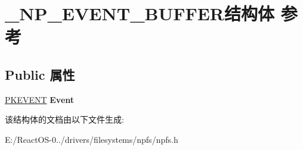 \hypertarget{struct___n_p___e_v_e_n_t___b_u_f_f_e_r}{}\section{\+\_\+\+N\+P\+\_\+\+E\+V\+E\+N\+T\+\_\+\+B\+U\+F\+F\+E\+R结构体 参考}
\label{struct___n_p___e_v_e_n_t___b_u_f_f_e_r}
\subsection*{Public 属性}
\begin{DoxyCompactItemize}
\item 
\mbox{\label{struct___n_p___e_v_e_n_t___b_u_f_f_e_r_ae2cadff7f9e0dba7adafa0858ba66b05}} 
\hyperlink{struct___k_e_v_e_n_t}{P\+K\+E\+V\+E\+NT} {\bfseries Event}
\end{DoxyCompactItemize}


该结构体的文档由以下文件生成\+:\begin{DoxyCompactItemize}
\item 
E\+:/\+React\+O\+S-\/0../drivers/filesystems/npfs/npfs.\+h\end{DoxyCompactItemize}
